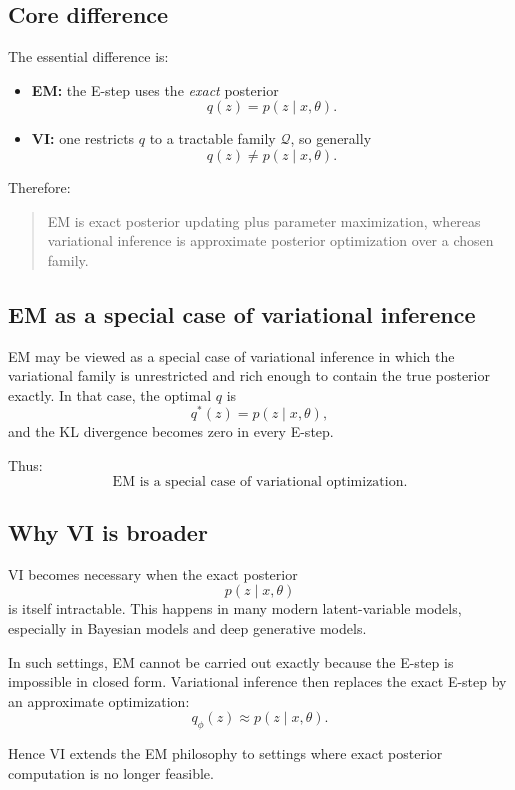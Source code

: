 \subsection{Core difference}

The essential difference is:

\begin{itemize}
    \item \textbf{EM:} the E-step uses the \emph{exact} posterior
    \[
    q(z)=p(z\mid x,\theta).
    \]
    \item \textbf{VI:} one restricts \(q\) to a tractable family \(\mathcal Q\), so generally
    \[
    q(z)\neq p(z\mid x,\theta).
    \]
\end{itemize}

Therefore:

\begin{quote}
EM is exact posterior updating plus parameter maximization, whereas variational inference is approximate posterior optimization over a chosen family.
\end{quote}

\subsection{EM as a special case of variational inference}

EM may be viewed as a special case of variational inference in which the variational family is unrestricted and rich enough to contain the true posterior exactly. In that case, the optimal \(q\) is
\[
q^*(z)=p(z\mid x,\theta),
\]
and the KL divergence becomes zero in every E-step.

Thus:
\[
\boxed{\text{EM is a special case of variational optimization.}}
\]

\subsection{Why VI is broader}

VI becomes necessary when the exact posterior
\[
p(z\mid x,\theta)
\]
is itself intractable. This happens in many modern latent-variable models, especially in Bayesian models and deep generative models.

In such settings, EM cannot be carried out exactly because the E-step is impossible in closed form. Variational inference then replaces the exact E-step by an approximate optimization:
\[
q_\phi(z)\approx p(z\mid x,\theta).
\]

Hence VI extends the EM philosophy to settings where exact posterior computation is no longer feasible.

